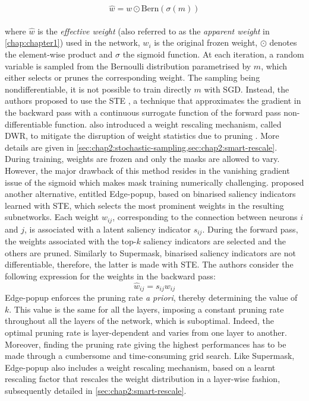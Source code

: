 \begin{equation}
  \label{eqn:chap2:sigmoid_reparam}
  \hat{w} = w \odot \text{Bern}(\sigma(m))
\end{equation}\\

where $\hat{w}$ is the \emph{effective weight} (also referred to as the
\emph{apparent weight} in \cref{chap:chapter1}) used in the network, $w_i$ is
the original frozen weight, $\odot$ denotes the element-wise product and
$\sigma$ the sigmoid function. At each iteration, a random variable is sampled
from the Bernoulli distribution parametrised by $m$, which either selects or
prunes the corresponding weight. The sampling being nondifferentiable, it is not
possible to train directly $m$ with \ac{SGD}. Instead, the authors proposed to
use the \ac{STE} \cite{DBLP:journals/corr/BengioLC13}, a technique that
approximates the gradient in the backward pass with a continuous surrogate
function of the forward pass non-differentiable function.
\citeauthor{DBLP:conf/nips/ZhouLLY19} also introduced a weight rescaling
mechanism, called \ac{DWR}, to mitigate the disruption of weight statistics due
to pruning \cite{DBLP:conf/iccv/HeZRS15}. More details are given in
\cref{sec:chap2:stochastic-sampling,sec:chap2:smart-rescale}.\\


During training, weights are frozen and only the masks are allowed to vary.
However, the major drawback of this method resides in the vanishing gradient
issue of the sigmoid which makes mask training numerically challenging.
\citeauthor{DBLP:conf/cvpr/RamanujanWKFR20}
\cite{DBLP:conf/cvpr/RamanujanWKFR20} proposed another alternative, entitled
Edge-popup, based on binarised saliency indicators learned with \ac{STE}, which
selects the most prominent weights in the resulting subnetworks. Each weight
$w_{ij}$, corresponding to the connection between neurons $i$ and $j$, is
associated with a latent saliency indicator $s_{ij}$. During the forward pass,
the weights associated with the top-$k$ saliency indicators are selected and the
others are pruned. Similarly to Supermask, binarised saliency indicators are not
differentiable, therefore, the latter is made with \ac{STE}. The authors
consider the following expression for the weights in the backward pass:
\begin{equation}
  \hat{w}_{ij} = s_{ij} w_{ij}
\end{equation}
Edge-popup enforces the pruning rate \textit{a priori}, thereby determining the
value of $k$. This value is the same for all the layers, imposing a constant
pruning rate throughout all the layers of the network, which is suboptimal.
Indeed, the optimal pruning rate is layer-dependent and varies from one layer to
another. Moreover, finding the pruning rate giving the highest performances has
to be made through a cumbersome and time-consuming grid search. Like Supermask,
Edge-popup also includes a weight rescaling mechanism, based on a learnt
rescaling factor that rescales the weight distribution in a layer-wise fashion,
subsequently detailed in \cref{sec:chap2:smart-rescale}.\\


